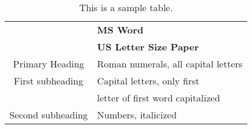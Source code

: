 \documentclass[english,aps,pra,reprint,noshowpacs,superscriptaddress]{revtex4-1}
\begin{document}
\begin{table}[htbp]
\caption{This is a sample table.\label{tab1}}
\begin{ruledtabular}
\begin{tabular}{cl}
 & \textbf{MS Word} \\
 & \textbf{US Letter Size Paper} \\
 \hline
Primary Heading & Roman numerals, all capital letters \\
First subheading & Capital letters, only first \\
 & letter of first word capitalized \\
Second subheading & Numbers, italicized 
\end{tabular}
\end{ruledtabular}
\end{table}

\newcommand\mathcourse[2]{\emph{#1}}
\newcommand\noted[2]{\textbf{#1} (#2)}
\newcommand\paradigm[1]{#1 (3)}
\newcommand\capstone[1]{#1 (3)}
\newcommand\onecredit[1]{#1 (1)}
\newcommand\threecredit[1]{#1 (3)}
\newcommand\fourcredit[1]{#1 (4)}
\end{document}
